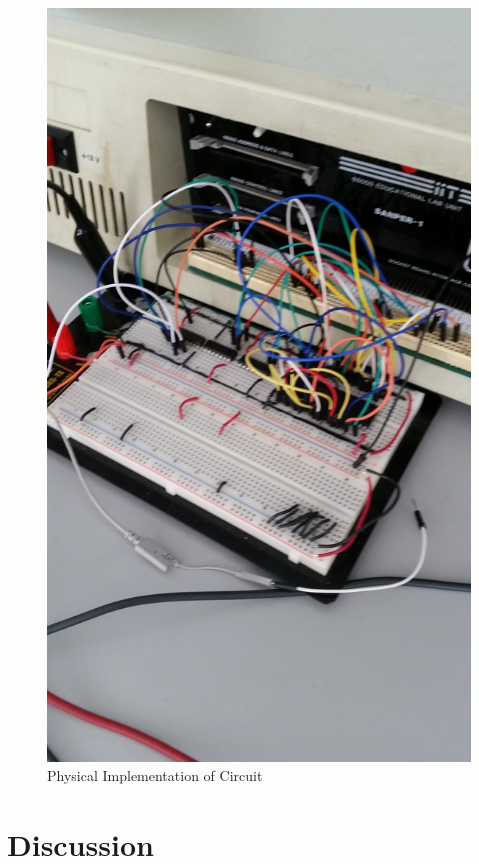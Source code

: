 \documentclass[12pt,Letter]{article}
\begin{document}
\begin{figure}[H]
\centering
\includegraphics[width=1\linewidth]{20150414_102437}
\caption{Physical Implementation of Circuit}
\label{fig:hardwareimp}
\end{figure}

\section{Discussion}
\end{document}
